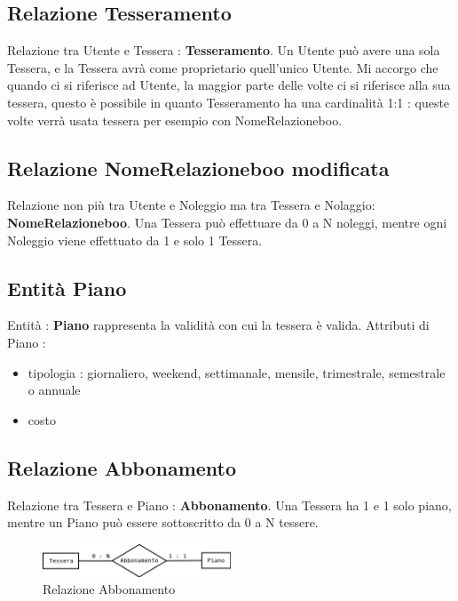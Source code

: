 \documentclass[a4paper,twoside]{article}
\begin{document}
\subsection{Relazione Tesseramento}
Relazione tra Utente e Tessera : \textbf{Tesseramento}.\newline
Un Utente può avere una sola Tessera, e la Tessera avrà come proprietario quell'unico Utente.\newline
Mi accorgo che quando ci si riferisce ad Utente, la maggior parte delle volte ci si riferisce alla sua tessera, questo è possibile in quanto Tesseramento ha una cardinalità 1:1 : queste volte verrà usata tessera per esempio con NomeRelazioneboo.

\subsection{Relazione NomeRelazioneboo modificata}
Relazione non più tra Utente e Noleggio ma tra Tessera e Nolaggio: \textbf{NomeRelazioneboo}.\newline
Una Tessera può effettuare da 0 a N noleggi, mentre ogni Noleggio viene effettuato da 1 e solo 1 Tessera.

\subsection{Entità Piano}
Entità : \textbf{Piano} rappresenta la validità con cui la tessera è valida.\newline
Attributi di Piano :
\begin{itemize}
 \item tipologia : giornaliero, weekend, settimanale, mensile, trimestrale, semestrale o annuale
 \item costo
\end{itemize}

\subsection{Relazione Abbonamento}
Relazione tra Tessera e Piano : \textbf{Abbonamento}.\newline
Una Tessera ha 1 e 1 solo piano, mentre un Piano può essere sottoscritto da 0 a N tessere.

\begin{figure}[h]
 \centering
  \includegraphics[width=0.5\textwidth]{Immagini/ConAbbonamento01}
\caption{Relazione Abbonamento}
\end{figure} 
\end{document}
